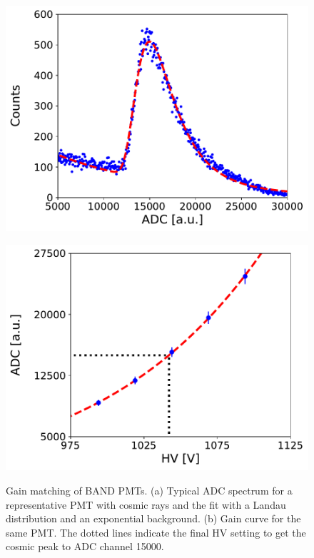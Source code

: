 \documentclass[3p,final,twocolumn]{elsarticle}
\begin{document}
\begin{figure}[th]
	\centering
		\begin{minipage}{0.48\textwidth}
			\includegraphics[width=\textwidth]{adc-fit-example.pdf}
					\subcaption{}
			\label{fig:adc-spectrum}
		\end{minipage}
		\begin{minipage}{0.47\textwidth}
			\includegraphics[width=\textwidth]{gainfit.pdf}
			\subcaption{}
		\label{fig:gain-curve}
		\end{minipage}
		\caption{Gain matching of BAND PMTs. (a) Typical ADC spectrum for a representative PMT with cosmic rays and the fit with a Landau distribution and an exponential background. (b) Gain curve for the same PMT. The dotted lines indicate the final HV setting to get the cosmic peak to ADC channel 15000. }
\end{figure}
\end{document}
